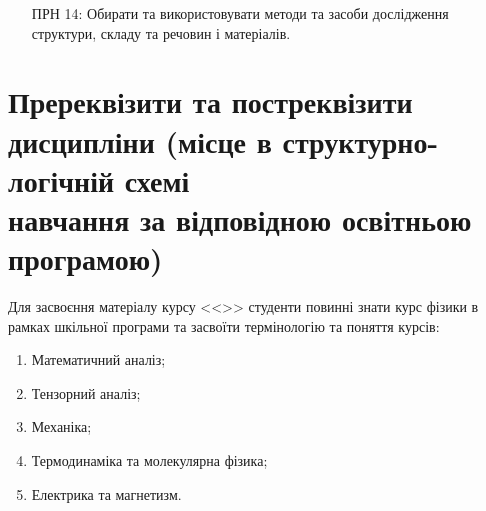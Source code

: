 \documentclass{Syllabus}
\begin{document}
\begin{enumerate}
\item [ПРН 14:] Обирати та використовувати методи та засоби дослідження структури, складу та речовин і матеріалів.
\end{enumerate}


\section{Пререквізити та постреквізити дисципліни (місце в структурно-логічній схемі\\ навчання за відповідною освітньою програмою)}


Для засвоєння матеріалу курсу <<\discipline>> студенти повинні знати курс фізики в рамках шкільної програми та засвоїти термінологію та поняття курсів:
\begin{enumerate}
    \item Математичний аналіз;
    \item Тензорний аналіз;
    \item Механіка;
    \item Термодинаміка та молекулярна фізика;
    \item Електрика та магнетизм.
\end{enumerate}
\end{document}
